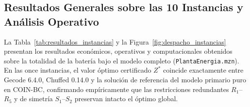 \subsection{Resultados Generales sobre las 10 Instancias y Análisis Operativo}

La Tabla~\ref{tab:resultados_instancias} y la Figura~\ref{fig:despacho_instancias} presentan los resultados económicos, operativos y computacionales obtenidos sobre la totalidad de la batería bajo el modelo completo (\texttt{PlantaEnergia.mzn}). En las once instancias, el valor óptimo certificado $Z^*$ coincide exactamente entre Gecode 6.4.0, Chuffed 0.14.0 y la solución de referencia del modelo primario puro en COIN-BC, confirmando empíricamente que las restricciones redundantes $R_1$--$R_5$ y de simetría $S_1$--$S_2$ preservan intacto el óptimo global.

